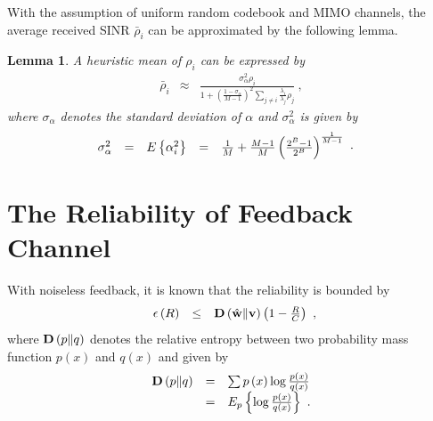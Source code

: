 \documentclass[10pt,fleqn, twocolumn]{IEEEtran}
\newtheorem{lemma}{Lemma}
\newcommand{\bv}{{\bf v}}
\newcommand{\bw}{{\bf w}}
\newcommand{\bD}{{\bf D}}
\begin{document}
\noindent With the assumption of uniform random codebook and MIMO
channels, the average received SINR $\bar\rho_{i}$ can be
approximated by the following lemma.
\begin{lemma} A heuristic mean of $\rho_{i}$
can be expressed by
\begin{equation}%
\begin{array}{rcl}
\bar\rho_{i}&\approx&\frac{\sigma_{\alpha}^{2}\rho_{i}}{1+
\left(\frac{1-\sigma_{\alpha}}{M-1}\right)^{2}\sum\limits_{j\neq
i}\frac{\lambda_{i}}{\lambda_{j}}\rho_{j}}\ ,
\end{array}
\end{equation}
\noindent where $\sigma_{\alpha}$ denotes the standard deviation
of $\alpha$ and $\sigma_{\alpha}^2$ is given by
\begin{equation}\hspace{-0.2in}
\begin{array}{rcccl}
\sigma_{\alpha}^2&=&\mbox{E}\left\{\alpha_{i}^2\right\}&=&\frac{1}{M}+\frac{M-1}{M}\left(\frac{2^B-1}{2^B}\right)^{\frac{1}{M-1}}
\end{array}.\label{sigma_alpha}
\end{equation}
\end{lemma}

\section{The Reliability of Feedback Channel}

With noiseless feedback, it is known that the reliability is
bounded by
\begin{equation}
\begin{array}{rcl}
\epsilon\left(R\right)&\leq&\bD\left(\hat{\bw}\|\bv\right)\left(1-\frac{R}{C}\right)
\end{array},
\end{equation}
\noindent where $\bD\left(p\| q\right)$ denotes the relative
entropy between two probability mass function $p\left(x\right)$
and $q\left(x\right)$ and given by
\begin{equation}
\begin{array}{rcl}
\bD\left(p\| q\right)&=&\sum
p\left(x\right)\log\frac{p\left(x\right)}{q\left(x\right)}\\
&=&E_{p}\left\{\log\frac{p\left(x\right)}{q\left(x\right)}\right\}\
.
\end{array}
\end{equation}
\end{document}
